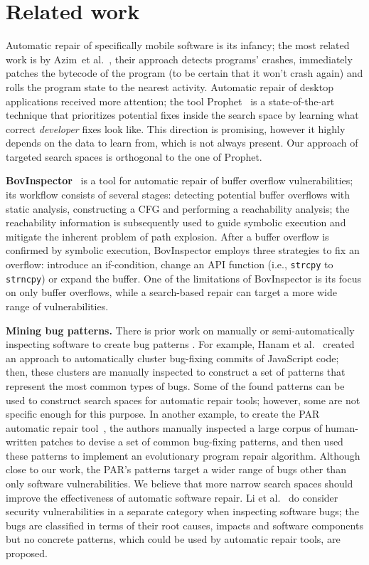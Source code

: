 \section{Related work}

Automatic repair of specifically mobile software is its infancy; the most related work is by Azim~et al.~\cite{azim2014towards}, their approach detects programs' crashes, immediately patches the bytecode of the program (to be certain that it won't crash again) and rolls the program state to the nearest activity.
Automatic repair of desktop applications received more attention; the tool Prophet~\cite{long2015prophet} is a state-of-the-art technique that prioritizes potential fixes inside the search space by learning what correct \emph{developer} fixes look like.
This direction is promising, however it highly depends on the data to learn from, which is not always present.
Our approach of targeted search spaces is orthogonal to the one of Prophet.

\textbf{BovInspector}~\cite{bovinspector} is a tool for automatic repair of buffer overflow vulnerabilities; its workflow consists of several stages: detecting potential buffer overflows with static analysis, constructing a CFG and performing a reachability analysis; the reachability information is subsequently used to guide symbolic execution and mitigate the inherent problem of path explosion.
After a buffer overflow is confirmed by symbolic execution, BovInspector employs three strategies to fix an overflow: introduce an if-condition, change an API function (i.e., \texttt{strcpy} to \texttt{strncpy}) or expand the buffer.
One of the limitations of BovInspector is its focus on only buffer overflows, while a search-based repair can target a more wide range of vulnerabilities.

\textbf{Mining bug patterns.} There is prior work on manually or semi-automatically inspecting software to create bug patterns \cite{hanam2016discovering, kim2013automatic}.
For example, Hanam et al.~\cite{hanam2016discovering} created an approach to automatically cluster bug-fixing commits of JavaScript code; then, these clusters are manually inspected to construct a set of patterns that represent the most common types of bugs.
Some of the found patterns can be used to construct search spaces for automatic repair tools; however, some are not specific enough for this purpose. 
In another example, to create the PAR automatic repair tool~\cite{kim2013automatic}, the authors manually inspected a large corpus of human-written patches to devise a set of common bug-fixing patterns, and then used these patterns to implement an evolutionary program repair algorithm.
Although close to our work, the PAR's patterns target a wider range of bugs other than only software vulnerabilities.
We believe that more narrow search spaces should improve the effectiveness of automatic software repair.
Li et al.~\cite{li2006have} do consider security vulnerabilities in a separate category when inspecting software bugs; the bugs are classified in terms of their root causes, impacts and software components but no concrete patterns, which could be used by automatic repair tools, are proposed.
